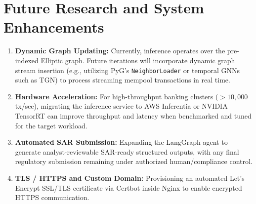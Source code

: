 \documentclass[11pt,a4paper]{report}
\begin{document}
\section{Future Research and System Enhancements}
\begin{enumerate}[leftmargin=1.5em]
  \item \textbf{Dynamic Graph Updating:} Currently, inference operates over the pre-indexed Elliptic graph. Future iterations will incorporate dynamic graph stream insertion (e.g., utilizing PyG's \texttt{NeighborLoader} or temporal GNNs such as TGN) to process streaming mempool transactions in real time.
  \item \textbf{Hardware Acceleration:} For high-throughput banking clusters ($> 10,000$ tx/sec), migrating the inference service to AWS Inferentia or NVIDIA TensorRT can improve throughput and latency when benchmarked and tuned for the target workload.
  \item \textbf{Automated SAR Submission:} Expanding the LangGraph agent to generate analyst-reviewable SAR-ready structured outputs, with any final regulatory submission remaining under authorized human/compliance control.
  \item \textbf{TLS / HTTPS and Custom Domain:} Provisioning an automated Let's Encrypt SSL/TLS certificate via Certbot inside Nginx to enable encrypted HTTPS communication.
\end{enumerate}
\end{document}
